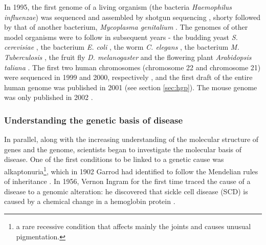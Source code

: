 


 
In 1995, the first genome of a living organism (the bacteria \textit{Haemophilus influenzae}) was sequenced and assembled by shotgun sequencing \cite{fleischmann1995whole}, shorty followed by that of another bacterium, \textit{Mycoplasma genitalium} \cite{fraser1995minimal}. 
The genomes of other model organisms were to follow in subsequent years - the budding yeast \textit{S. cerevisiae} \cite{goffeau1996life}, the bacterium \textit{E. coli} \cite{blattner1997complete}, the worm \textit{C. elegans} \cite{c1998genome}, the bacterium \textit{M. Tuberculosis} \cite{cole1998deciphering}, the fruit fly \textit{D. melanogaster} \cite{adams2000genome} and the flowering plant \textit{Arabidopsis taliana} \cite{kaul2000analysis}.
The first two human chromosomes (chromosome 22 and chromosome 21) were sequenced in 1999 and 2000, respectively \cite{dunham1999dna, hattori2000dna}, and the first draft of the entire human genome was published in 2001 \cite{lander2001initial, venter2001sequence} (see section \ref{sec:hgp}).
The mouse genome was only published in 2002 \cite{waterston2002initial}.

\subsubsection{Understanding the genetic basis of disease}

In parallel, along with the increasing understanding of the molecular structure of genes and the genome, scientists began to investigate the molecular basis of disease.
One of the first conditions to be linked to a genetic cause was alkaptonuria\footnote{a rare recessive condition that affects mainly the joints and causes unusual pigmentation.}, which in 1902 Garrod had identified  to follow the Mendelian rules of inheritance \cite{garrod1902incidence}.
In 1956, Vernon Ingram for the first time traced the cause of a disease to a genomic alteration: he discovered that sickle cell disease (SCD) is caused by a chemical change in a hemoglobin protein \cite{ingram1963hemoglobins}.
\\

